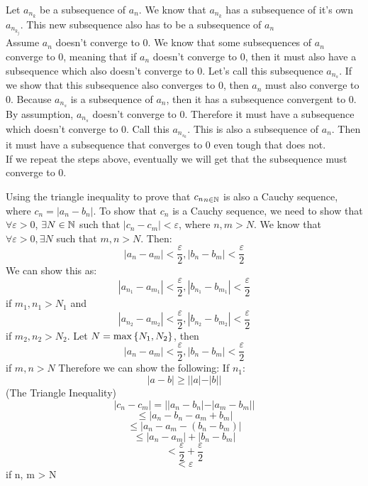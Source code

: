 \documentclass{article}
\begin{document}
\begin{homeworkProblem}
    \solution
    Let ${a_{n_k}}$ be a subsequence of ${a_n}$. We know that ${a_{n_k}}$ has a subsequence of it's own ${a_{n_{k_j}}}$. This new subsequence also has to be a subsequence of ${a_n}$\\Assume ${a_n}$ doesn't  converge to 0. We know that some subsequences of ${a_n}$ converge to 0, meaning that if ${a_n}$ doesn't converge to 0, then it must also have a subsequence which also doesn't converge to 0. Let's call this subsequence ${a_{n_s}}$. If we show that this subsequence also converges to 0, then ${a_{n}}$ must also converge to 0. Because ${a_{n_s}}$  is a subsequence of ${a_{n}}$, then it has a subsequence convergent to 0. By assumption, ${a_{n_s}}$ doesn't converge to 0. Therefore it must have a subsequence which doesn't converge to 0. Call this ${a_{n_{s_k}}}$. This is also a subsequence of ${a_n}$. Then it must have a subsequence that converges to 0  even tough that does not.\\If we repeat the steps above, eventually we will get that the subsequence must converge to 0.
\end{homeworkProblem}
\begin{homeworkProblem}
    \solution
    Using the triangle inequality to prove that ${c_n}_{n \in \mathbb{N}}$ is also a Cauchy sequence, where $c_n = |a_n - b_n|$. To show that ${c_n}$ is a Cauchy sequence, we need to show that $\forall \varepsilon > 0$, $\exists N \in \mathbb{N}$ such that $|c_n - c_m| < \varepsilon$, where $n, m > N$. We know that $\forall \varepsilon > 0, \exists N$ such that $m, n > N$. Then: $$|a_n - a_m| < \frac{\varepsilon}{2}, |b_n - b_m| < \frac{\varepsilon}{2}$$
    We can show this as: $$|a_{n_1} - a_{m_1}| < \frac{\varepsilon}{2}, |b_{n_1} - b_{m_1}| < \frac{\varepsilon}{2}$$if $m_1, n_1 > N_1$ and $$|a_{n_2} - a_{m_2}| < \frac{\varepsilon}{2}, |b_{n_2} - b_{m_2}| < \frac{\varepsilon}{2}$$ if $m_2, n_2 > N_2$. Let $N = \max \left\{N_1, N_2\right\}$, then $$|a_n - a_m| < \frac{\varepsilon}{2}, |b_n - b_m| < \frac{\varepsilon}{2}$$ if $m, n > N$ Therefore we can  show the following: If $n_1$: $$|a - b| \geq ||a| - |b||$$(The Triangle Inequality) $$|c_n - c_m| = ||a_n - b_n| - |a_m - b_m||$$ $$\leq |a_n - b_n - a_m + b_m|$$ $$\leq|a_n - a_m - (b_n - b_m)|$$ $$\leq|a_n - a_m| + |b_n - b_m|$$ $$< \frac{\varepsilon}{2} + \frac{\varepsilon}{2}$$ $$< \varepsilon$$ if n, m > N
\end{homeworkProblem}
\end{document}
